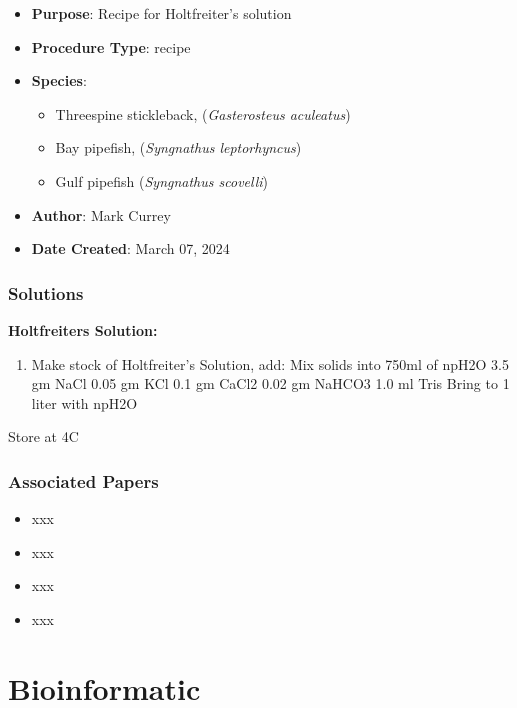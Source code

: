 \documentclass[
  letterpaper,
  DIV=11,
  numbers=noendperiod]{scrreprt}
\providecommand{\tightlist}{%
  \setlength{\itemsep}{0pt}\setlength{\parskip}{0pt}}\usepackage{longtable,booktabs,array}
\begin{document}
\begin{itemize}
\tightlist
\item
  \textbf{Purpose}: Recipe for Holtfreiter's solution\\
\item
  \textbf{Procedure Type}: recipe
\item
  \textbf{Species}:

  \begin{itemize}
  \tightlist
  \item
    Threespine stickleback, (\emph{Gasterosteus aculeatus})
  \item
    Bay pipefish, (\emph{Syngnathus leptorhyncus})
  \item
    Gulf pipefish (\emph{Syngnathus scovelli})
  \end{itemize}
\item
  \textbf{Author}: Mark Currey
\item
  \textbf{Date Created}: March 07, 2024
\end{itemize}

\hypertarget{solutions-97}{%
\section{Solutions}\label{solutions-97}}

\textbf{Holtfreiters Solution:}

\begin{enumerate}
\def\labelenumi{\arabic{enumi}.}
\tightlist
\item
  Make stock of Holtfreiter's Solution, add: Mix solids into 750ml of
  npH2O 3.5 gm NaCl 0.05 gm KCl 0.1 gm CaCl2 0.02 gm NaHCO3 1.0 ml Tris
  Bring to 1 liter with npH2O
\end{enumerate}

Store at 4C

\hypertarget{associated-papers-80}{%
\section{Associated Papers}\label{associated-papers-80}}

\begin{itemize}
\tightlist
\item
  xxx
\item
  xxx
\item
  xxx
\item
  xxx
\end{itemize}

\part{Bioinformatic}
\end{document}
